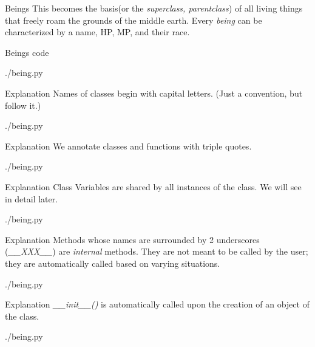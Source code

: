 \documentclass{beamer}
\begin{document}
\begin{frame}{Beings}
  This becomes the basis(or the \textit{superclass, parentclass}) of all living things that freely
  roam the grounds of the middle earth.  Every \textit{being} can be
  characterized by a name, HP, MP, and their race.
\end{frame}

\begin{frame}{Beings code}
  \begin{lstinputlisting}[firstline=1, lastline=23]
    {./being.py}
  \end{lstinputlisting}
\end{frame}

\begin{frame}{Explanation}
  Names of classes begin with capital letters. (Just a convention, but follow
  it.)
  \begin{lstinputlisting}[firstline=1, lastline=1]
    {./being.py}
  \end{lstinputlisting}
\end{frame}

\begin{frame}{Explanation}
  We annotate classes and functions with triple quotes.
  \begin{lstinputlisting}[firstline=1, lastline=2]
    {./being.py}
  \end{lstinputlisting}
\end{frame}

\begin{frame}{Explanation}
  Class Variables are shared by all instances of the class.
  We will see in detail later.
  \begin{lstinputlisting}[firstline=1, lastline=5]
    {./being.py}
  \end{lstinputlisting}
\end{frame}


\begin{frame}{Explanation}
  Methods whose names are surrounded by 2 underscores
  (\textit{\_\_XXX\_\_}) are
  \textit{internal} methods.
  They are not meant to be called by the user; they are
  automatically called based on varying situations.
  \begin{lstinputlisting}[firstline=1, lastline=7]
    {./being.py}
  \end{lstinputlisting}
\end{frame}

\begin{frame}{Explanation}
  \textit{\_\_init\_\_()} is automatically called upon the creation of an object of the
  class.
  \begin{lstinputlisting}[firstline=7, lastline=14]
    {./being.py}
  \end{lstinputlisting}
\end{frame}
\end{document}
